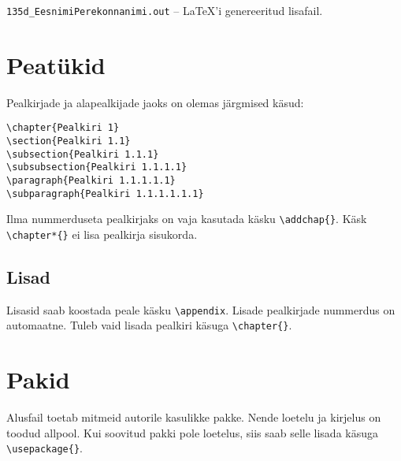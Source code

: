 \documentclass{trkut}%
\begin{document}
\verb!135d_EesnimiPerekonnanimi.out! -- \LaTeX'i genereeritud lisafail.

\section{Peatükid}
Pealkirjade ja alapealkijade jaoks on olemas järgmised käsud:
\begin{verbatim}
\chapter{Pealkiri 1}
\section{Pealkiri 1.1}
\subsection{Pealkiri 1.1.1}
\subsubsection{Pealkiri 1.1.1.1}
\paragraph{Pealkiri 1.1.1.1.1}
\subparagraph{Pealkiri 1.1.1.1.1.1}
\end{verbatim}

Ilma nummerduseta pealkirjaks on vaja kasutada käsku \verb!\addchap{}!. Käsk \verb!\chapter*{}! ei lisa pealkirja sisukorda.

\subsection{Lisad}
Lisasid saab koostada peale käsku \verb!\appendix!. Lisade pealkirjade nummerdus on automaatne. Tuleb vaid lisada pealkiri käsuga \verb!\chapter{}!.

\section{Pakid}
Alusfail toetab mitmeid autorile kasulikke pakke. Nende loetelu ja kirjelus on toodud allpool. Kui soovitud pakki pole loetelus, siis saab selle lisada käsuga \verb!\usepackage{}!.
\end{document}
